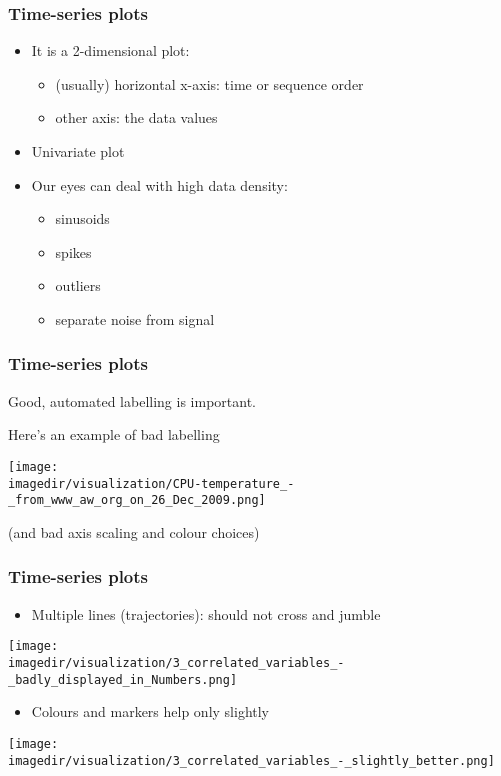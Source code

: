 \begin{frame}\frametitle{Time-series plots}
	\begin{itemize}
		\item	It is a 2-dimensional plot: 
		\begin{itemize}
			\item	(usually) horizontal x-axis: time or sequence order 
			\item	other axis: the data values 
		\end{itemize}
		\item	Univariate plot 
	\end{itemize}
	\begin{itemize}
		\item	Our eyes can deal with high data density: 
		\begin{itemize}
			\item	sinusoids 
			\item	spikes 
			\item	outliers 
			\item	separate noise from signal 
		\end{itemize}
	\end{itemize}
\end{frame}

\begin{frame}\frametitle{Time-series plots}
	
	Good, automated labelling is important.
	
	Here's an example of bad labelling
	\begin{center}
		\texttt{[image: \\imagedir/visualization/CPU-temperature\_-\_from\_www\_aw\_org\_on\_26\_Dec\_2009.png]}
	\end{center}
	(and bad axis scaling and colour choices)
\end{frame}

\begin{frame}\frametitle{Time-series plots}
	\begin{itemize}
		\item	Multiple lines (trajectories): should not cross and jumble 
	\end{itemize}
	\begin{center}
		\texttt{[image: \\imagedir/visualization/3\_correlated\_variables\_-\_badly\_displayed\_in\_Numbers.png]}
	\end{center}
	\begin{itemize}
		\item	Colours and markers help only slightly 
	\end{itemize}
	\begin{center}
		\texttt{[image: \\imagedir/visualization/3\_correlated\_variables\_-\_slightly\_better.png]}
	\end{center}
\end{frame}

